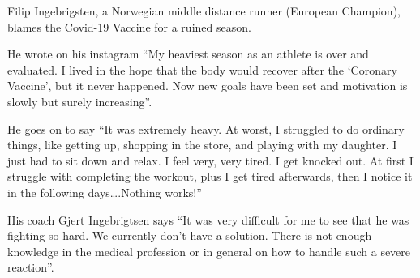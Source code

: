 Filip Ingebrigsten, a Norwegian middle distance runner (European Champion),
blames the Covid-19 Vaccine for a ruined season.

He wrote on his instagram “My heaviest season as an athlete is over and
evaluated. I lived in the hope that the body would recover after the ‘Coronary
Vaccine’, but it never happened. Now new goals have been set and motivation is
slowly but surely increasing”.

He goes on to say “It was extremely heavy. At worst, I struggled to do ordinary
things, like getting up, shopping in the store, and playing with my daughter. I
just had to sit down and relax. I feel very, very tired. I get knocked out. At
first I struggle with completing the workout, plus I get tired afterwards, then
I notice it in the following days….Nothing works!”

His coach Gjert Ingebrigtsen says “It was very difficult for me to see that he
was fighting so hard. We currently don’t have a solution. There is not enough
knowledge in the medical profession or in general on how to handle such a severe
reaction”.
